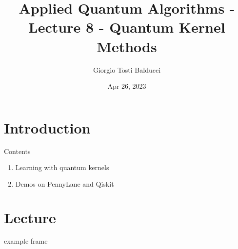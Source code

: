 \documentclass[aspectratio=43]{beamer}
\title[]{Applied Quantum Algorithms - Lecture 8 - Quantum Kernel Methods}
\institute[]{Delft University of Technology, The Netherlands}
\author{Giorgio Tosti Balducci}
\date{Apr 26, 2023}
\begin{document}
\section{Introduction}
{
\frame{\titlepage}
}

\begin{frame}{Contents} %
\begin{enumerate}
  \item Learning with quantum kernels
  \item Demos on PennyLane and Qiskit
\end{enumerate}
\end{frame}

\section{Lecture}

\begin{frame}{example frame}
    
\end{frame}


\end{document}
